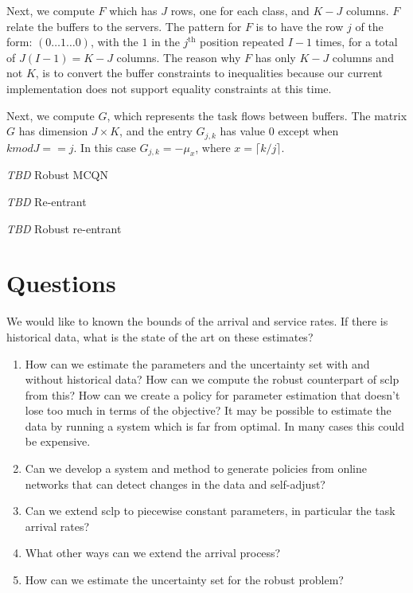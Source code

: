 \documentclass[11pt,a4paper,titlepage]{article}
\newcommand\tbd{{\color{orange}\textit{TBD}}}
\theoremstyle{definition}
\begin{document}
Next, we compute $F$ which has $J$ rows,
one for each class,
and $K-J$ columns.
$F$ relate the buffers to the servers.
The pattern for $F$ is to have the row $j$ of the form:
$(0 \ldots 1 \dots 0)$,
with the $1$ in the $j^{\text{th}}$ position repeated $I-1$ times,
for a total of $J(I-1)=K-J$ columns.
The reason why $F$ has only $K-J$ columns and not $K$,
is to convert the buffer constraints to inequalities because our current implementation does not support equality constraints at this time.

Next, we compute $G$,
which represents the task flows between buffers.
The matrix $G$ has dimension $J \times K$,
and the entry $G_{j,k}$ has value $0$ except when $k mod J == j$.
In this case $G_{j,k} = -\mu_x$, where $x= \lceil{k/j}\rceil$.

\tbd{} Robust MCQN

\tbd{} Re-entrant

\tbd{} Robust re-entrant

\section{Questions}
\label{sec:questions}

We would like to known the bounds of the arrival and service rates.
If there is historical data,
what is the state of the art on these estimates?

\begin{enumerate}
    \item How can we estimate the parameters and the uncertainty set with and
    without historical data?
    How can we compute the robust counterpart of \gls{sclp} from this?
    How can we create a policy for parameter estimation that doesn't lose too
    much in terms of the objective?
    It may be possible to estimate the data by running a system which is far
    from optimal.
    In many cases this could be expensive.
    \item Can we develop a system and method to generate policies from online
    networks that can detect changes in the data and self-adjust?
    \item Can we extend \gls{sclp} to piecewise constant parameters,
    in particular the task arrival rates?
    \item What other ways can we extend the arrival process?
    \item How can we estimate the uncertainty set for the robust problem?
\end{enumerate}

\printbibliography
\label{sec:bibliography}
\end{document}
